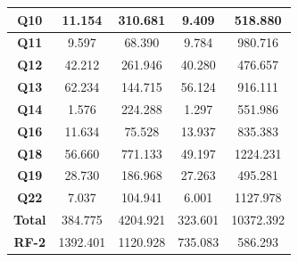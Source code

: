 \begin{table}[t]
\begin{tabular}{|c|c|c|c|c|}
                \hline
                 \textbf{Q10}         & 11.154            & 310.681                       & 9.409             & 518.880                   \\ 
                \hline
                 \textbf{Q11}         & 9.597             & 68.390                        & 9.784             & 980.716                   \\ 
                \hline
                 \textbf{Q12}         & 42.212            & 261.946                       & 40.280            & 476.657                   \\ 
                \hline
                 \textbf{Q13}         & 62.234            & 144.715                       & 56.124            & 916.111                   \\ 
                \hline
                 \textbf{Q14}         & 1.576             & 224.288                       & 1.297             & 551.986                   \\ 
                \hline
                 \textbf{Q16}         & 11.634            & 75.528                        & 13.937            & 835.383                   \\ 
                \hline
                 \textbf{Q18}         & 56.660            & 771.133                       & 49.197            & 1224.231                  \\ 
                \hline
                 \textbf{Q19}         & 28.730            & 186.968                       & 27.263            & 495.281                   \\ 
                \hline
                 \textbf{Q22}         & 7.037             & 104.941                       & 6.001             & 1127.978                  \\ 
                \hline
                 \textbf{Total}       & 384.775           & 4204.921                      & 323.601           & 10372.392                 \\ 
                \hline
                 \textbf{RF-2}        & 1392.401          & 1120.928                      & 735.083           & 586.293                   \\
                \hline
                \end{tabular}
                \end{table}


